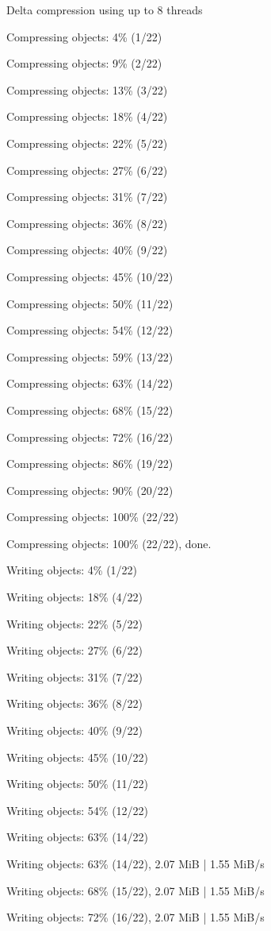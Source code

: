 \documentclass[11pt,a4paper]{article}
\begin{document}
Delta compression using up to 8 threads

Compressing objects:   4\% (1/22)

Compressing objects:   9\% (2/22)

Compressing objects:  13\% (3/22)

Compressing objects:  18\% (4/22)

Compressing objects:  22\% (5/22)

Compressing objects:  27\% (6/22)

Compressing objects:  31\% (7/22)

Compressing objects:  36\% (8/22)

Compressing objects:  40\% (9/22)

Compressing objects:  45\% (10/22)

Compressing objects:  50\% (11/22)

Compressing objects:  54\% (12/22)

Compressing objects:  59\% (13/22)

Compressing objects:  63\% (14/22)

Compressing objects:  68\% (15/22)

Compressing objects:  72\% (16/22)

Compressing objects:  86\% (19/22)

Compressing objects:  90\% (20/22)

Compressing objects: 100\% (22/22)

Compressing objects: 100\% (22/22), done.

Writing objects:   4\% (1/22)

Writing objects:  18\% (4/22)

Writing objects:  22\% (5/22)

Writing objects:  27\% (6/22)

Writing objects:  31\% (7/22)

Writing objects:  36\% (8/22)

Writing objects:  40\% (9/22)

Writing objects:  45\% (10/22)

Writing objects:  50\% (11/22)

Writing objects:  54\% (12/22)

Writing objects:  63\% (14/22)

Writing objects:  63\% (14/22), 2.07 MiB | 1.55 MiB/s

Writing objects:  68\% (15/22), 2.07 MiB | 1.55 MiB/s

Writing objects:  72\% (16/22), 2.07 MiB | 1.55 MiB/s
\end{document}
